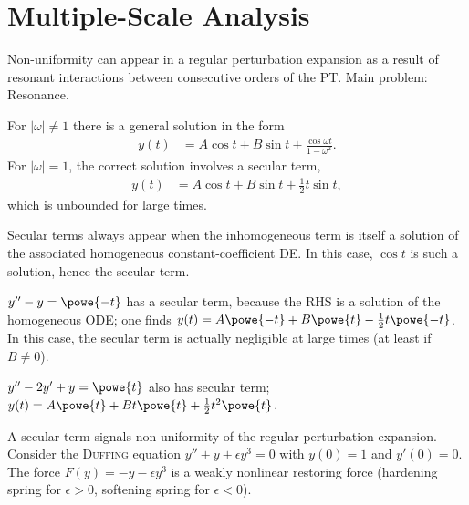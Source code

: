 \documentclass[english, parskip=full]{scrbook}
\newcommand{\note}[1]{\begin{tcolorbox}[colback=colorbackgroundnote,colframe=colornote, breakable,enhanced]#1\end{tcolorbox}}
\newcommand{\example}[3]{\begin{tcolorbox}[colback=colorbackgroundexample,colframe=colorexample, breakable,enhanced,title={\textbf{#1}: #2.}]#3\end{tcolorbox}}
\begin{document}
\chapter{Multiple-Scale Analysis}
Non-uniformity can appear in a regular perturbation expansion as a result of resonant interactions between consecutive orders of the PT.
Main problem: Resonance.
\example{Driven Harmonic Oscillator}{$y''+y = \cos \omega t$}{
For $|\omega| \neq 1$ there is a general solution in the form
\begin{align}
y(t) &= A\cos t + B\sin t + \frac{\cos\omega t}{1-\omega^2}.
\end{align}
For $|\omega| = 1$, the correct solution involves a secular term,
\begin{align}
y(t) &= A\cos t + B\sin t + \frac{1}{2} t\sin t,
\end{align}
which is unbounded for large times.
\note{
Secular terms always appear when the inhomogeneous term is itself a solution of the associated homogeneous constant-coefficient DE.
In this case, $\cos t$ is such a solution, hence the secular term.
}
}
\example{More Examples}{}{
$y''-y=\powe{-t}$ has a secular term, because the RHS is a solution of the homogeneous ODE; one finds $y(t)=A\powe{-t} + B\powe{t} - \frac{1}{2} t\powe{-t}$.
In this case, the secular term is actually negligible at large times (at least if $B\neq 0$).

$y''-2y'+y = \powe{t}$ also has secular term; $y(t) = A\powe{t} + Bt\powe{t} + \frac{1}{2}t^2\powe{t}$.
}
A secular term signals non-uniformity of the regular perturbation expansion.
Consider the \textsc{Duffing} equation $y''+y+\epsilon y^3=0$ with $y(0)=1$ and $y'(0)=0$.
The force $F(y)=-y-\epsilon y^3$ is a weakly nonlinear restoring force (hardening spring for $\epsilon > 0$, softening spring for $\epsilon < 0$).
\end{document}
